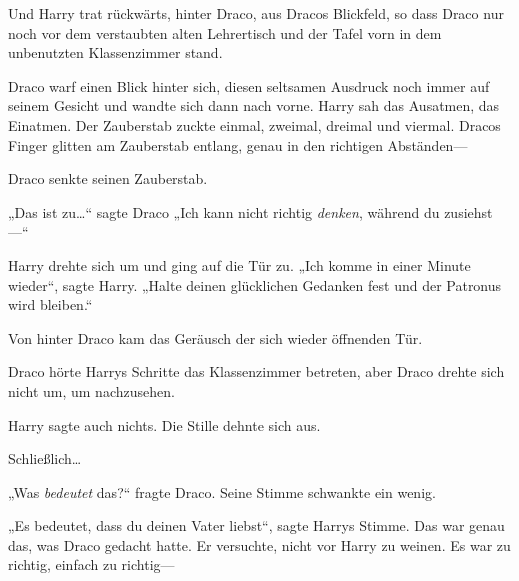 Und Harry trat rückwärts, hinter Draco, aus Dracos Blickfeld, so dass Draco nur noch vor dem verstaubten alten Lehrertisch und der Tafel vorn in dem unbenutzten Klassenzimmer stand.

Draco warf einen Blick hinter sich, diesen seltsamen Ausdruck noch immer auf seinem Gesicht und wandte sich dann nach vorne. Harry sah das Ausatmen, das Einatmen. Der Zauberstab zuckte einmal, zweimal, dreimal und viermal. Dracos Finger glitten am Zauberstab entlang, genau in den richtigen Abständen—

Draco senkte seinen Zauberstab.

„Das ist zu…“ sagte Draco „Ich kann nicht richtig \emph{denken}, während du zusiehst—“

Harry drehte sich um und ging auf die Tür zu. „Ich komme in einer Minute wieder“, sagte Harry. „Halte deinen glücklichen Gedanken fest und der Patronus wird bleiben.“

\later

Von hinter Draco kam das Geräusch der sich wieder öffnenden Tür.

Draco hörte Harrys Schritte das Klassenzimmer betreten, aber Draco drehte sich nicht um, um nachzusehen.

Harry sagte auch nichts. Die Stille dehnte sich aus.

Schließlich…

„Was \emph{bedeutet} das?“ fragte Draco. Seine Stimme schwankte ein wenig.

„Es bedeutet, dass du deinen Vater liebst“, sagte Harrys Stimme. Das war genau das, was Draco gedacht hatte. Er versuchte, nicht vor Harry zu weinen. Es war zu richtig, einfach zu richtig—

